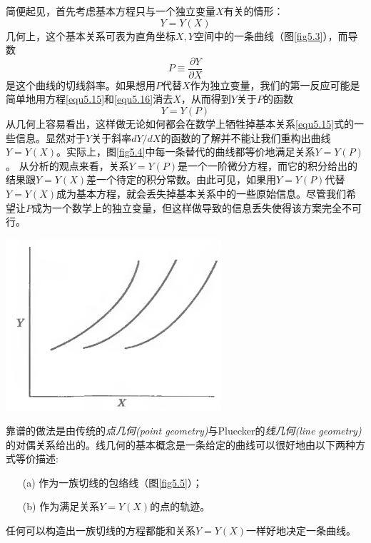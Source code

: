 简便起见，首先考虑基本方程只与一个独立变量$X$有关的情形：
\begin{equation}
\label{equ5.15}
	Y=Y(X)
\end{equation}
几何上，这个基本关系可表为直角坐标$X, Y$空间中的一条曲线（图\ref{fig5.3}），而导数
\begin{equation}
\label{equ5.16}
	P\equiv\frac{\partial Y}{\partial X}
\end{equation}
是这个曲线的切线斜率。如果想用$P$代替$X$作为独立变量，我们的第一反应可能是简单地用方程\eqref{equ5.15}和\eqref{equ5.16}消去$X$，从而得到$Y$关于$P$的函数
\begin{equation}
\label{equ5.17}
	Y=Y(P)
\end{equation}
从几何上容易看出，这样做无论如何都会在数学上牺牲掉基本关系\eqref{equ5.15}式的一些信息。显然对于$Y$关于斜率$dY/dX$的函数的了解并不能让我们重构出曲线$Y=Y(X)$。实际上，图\ref{fig5.4}中每一条替代的曲线都等价地满足关系$Y=Y(P)$。
从分析的观点来看，关系$Y=Y(P)$是一个一阶微分方程，而它的积分给出的结果跟$Y=Y(X)$差一个待定的积分常数。由此可见，如果用$Y=Y(P)$代替$Y=Y(X)$成为基本方程，就会丢失掉基本关系中的一些原始信息。尽管我们希望让$P$成为一个数学上的独立变量，但这样做导致的信息丢失使得该方案完全不可行。

{
	\centering
	\includegraphics[width=0.6\textwidth]{Pictures/fig5.4.png}
	\figcaption{}
	\label{fig5.4}
}

靠谱的做法是由传统的{\it 点几何(point geometry)}与Pluecker的{\it 线几何(line geometry)}的对偶关系给出的。线几何的基本概念是一条给定的曲线可以很好地由以下两种方式等价描述:

\begin{itemize}
\item[(a)] 作为一族切线的包络线（图\ref{fig5.5}）；
\item[(b)] 作为满足关系$Y=Y(X)$的点的轨迹。
\end{itemize}

任何可以构造出一族切线的方程都能和关系$Y=Y(X)$一样好地决定一条曲线。

